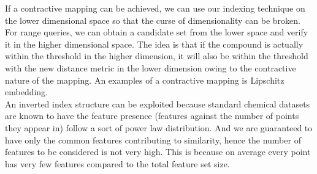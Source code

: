 If a contractive mapping can be achieved, we can use our indexing technique on the lower dimensional space so that the curse of dimensionality can be broken. For range queries, we can obtain a candidate set from the lower space and verify it in the higher dimensional space. The idea is that if the compound is actually within the threshold in the higher dimension, it will also be within the threshold with the new distance metric in the lower dimension owing to the contractive nature of the mapping. An examples of a contractive mapping is Lipschitz embedding.\\

An inverted index structure can be exploited because standard chemical datasets are known to have the feature presence (features against the number of points they appear in) follow a sort of power law distribution. And we are guaranteed to have only the common features contributing to similarity, hence the number of features to be considered is not very high. This is because on average every point has very few features compared to the total feature set size.\\
